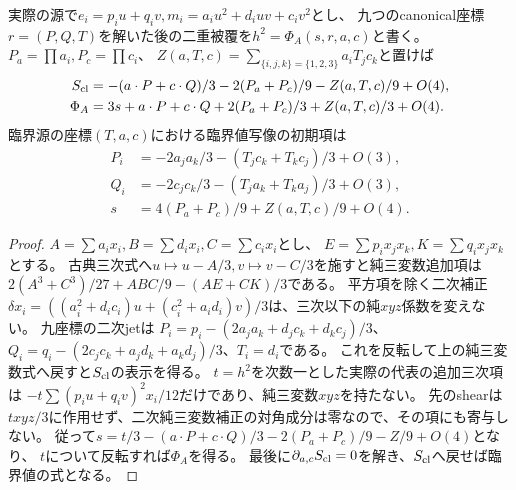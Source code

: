\begin{proposition}[元の源係数での相対三次jet]
実際の源で$e_i=p_iu+q_iv,m_i=a_iu^2+d_iuv+c_iv^2$とし、
九つのcanonical座標$r=(P,Q,T)$を解いた後の二重被覆を$h^2=\Phi_A(s,r,a,c)$と書く。
$P_a=\prod a_i,P_c=\prod c_i$、
$Z(a,T,c)=\sum_{\{i,j,k\}=\{1,2,3\}}a_iT_jc_k$と置けば
\begin{align*}
 S_{\rm cl}&=-(a\cdot P+c\cdot Q)/3-2(P_a+P_c)/9-Z(a,T,c)/9+O(4),\\
 \Phi_A&=3s+a\cdot P+c\cdot Q+2(P_a+P_c)/3+Z(a,T,c)/3+O(4).
\end{align*}
臨界源の座標$(T,a,c)$における臨界値写像の初期項は
\begin{align*}
 P_i&=-2a_ja_k/3-(T_jc_k+T_kc_j)/3+O(3),\\
 Q_i&=-2c_jc_k/3-(T_ja_k+T_ka_j)/3+O(3),\\
 s&=4(P_a+P_c)/9+Z(a,T,c)/9+O(4).
\end{align*}
\end{proposition}
\begin{proof}
$A=\sum a_ix_i,B=\sum d_ix_i,C=\sum c_ix_i$とし、
$E=\sum p_ix_jx_k,K=\sum q_ix_jx_k$とする。
古典三次式へ$u\mapsto u-A/3,v\mapsto v-C/3$を施すと純三変数追加項は
$2(A^3+C^3)/27+ABC/9-(AE+CK)/3$である。
平方項を除く二次補正$\delta x_i=((a_i^2+d_ic_i)u+(c_i^2+a_id_i)v)/3$は、三次以下の純$xyz$係数を変えない。
九座標の二次jetは
$P_i=p_i-(2a_ja_k+d_jc_k+d_kc_j)/3$、
$Q_i=q_i-(2c_jc_k+a_jd_k+a_kd_j)/3$、$T_i=d_i$である。
これを反転して上の純三変数式へ戻すと$S_{\rm cl}$の表示を得る。
$t=h^2$を次数一とした実際の代表の追加三次項は
$-t\sum(p_iu+q_iv)^2x_i/12$だけであり、純三変数$xyz$を持たない。
先のshearは$txyz/3$に作用せず、二次純三変数補正の対角成分は零なので、その項にも寄与しない。
従って$s=t/3-(a\cdot P+c\cdot Q)/3-2(P_a+P_c)/9-Z/9+O(4)$となり、
$t$について反転すれば$\Phi_A$を得る。
最後に$\partial_{a,c}S_{\rm cl}=0$を解き、$S_{\rm cl}$へ戻せば臨界値の式となる。
\end{proof}
